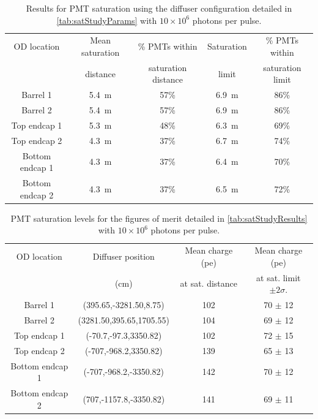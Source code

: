 \documentclass[a4paper,11pt]{article}
\begin{document}
\begin{table}[ht!]
    \centering
    \begin{tabular}{|c|c|c|c|c|}
    \hline
        OD location & Mean saturation & \% PMTs within & Saturation  & \% PMTs within \\
                    &  distance & saturation distance & limit &  saturation limit\\
        \hline
        Barrel 1        & 5.4~m  & 57\%       & 6.9~m   & 86\% \\
        Barrel 2        & 5.4~m  & 57\%       & 6.9~m   & 86\% \\
		Top endcap 1    & 5.3~m  & 48\%       & 6.3~m & 69\% \\
        Top endcap 2    & 4.3~m  & 37\%       & 6.7~m & 74\% \\ 
		Bottom endcap 1 & 4.3~m  & 37\%       & 6.4~m & 70\% \\
		Bottom endcap 2 & 4.3~m  & 37\%       & 6.5~m & 72\% \\
        \hline
    \end{tabular}
    \caption{Results for PMT saturation using the diffuser configuration detailed in \cref{tab:satStudyParams} with $10\times10^6$ photons per pulse.}
    \label{tab:satStudyResults10M}
\end{table}
%
\begin{table}[ht!]
    \centering
    \begin{tabular}{|c|c|c|c|}
    \hline
        OD location &Diffuser position & Mean charge (pe)   & Mean charge (pe)    \\
                    &  (cm)                & at sat. distance & at sat. limit $\pm2\sigma$.  \\
        \hline
        Barrel 1       & (395.65,-3281.50,8.75)   & 102  & 70 $\pm$ 12 \\ 
        Barrel 2       & (3281.50,395.65,1705.55) & 104  & 69 $\pm$ 12 \\ 
        Top endcap 1   & (-70.7,-97.3,3350.82)    & 102  & 72 $\pm$ 15 \\
        Top endcap 2   & (-707,-968.2,3350.82)    & 139  & 65 $\pm$ 13 \\
        Bottom endcap 1 & (-707,-968.2,-3350.82)  & 142  & 70 $\pm$ 12 \\ 
        Bottom endcap 2 & (707,-1157.8,-3350.82)  & 141  & 69 $\pm$ 11 \\ 
        \hline
    \end{tabular}
    \caption{PMT saturation levels for the figures of merit detailed in \cref{tab:satStudyResults} with $10\times10^6$ photons per pulse.}
    \label{tab:satStudyResults10M_pevalues}
\end{table}
\end{document}
